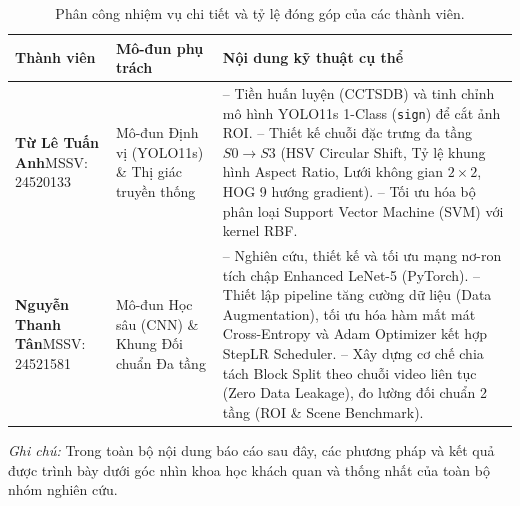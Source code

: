 \begin{table}[H]
\centering
\small
\caption{Phân công nhiệm vụ chi tiết và tỷ lệ đóng góp của các thành viên.}
\label{tab:phan_cong}
\begin{tabularx}{\textwidth}{|p{3.2cm}|p{3.5cm}|Y|}
\hline
\textbf{Thành viên} & \textbf{Mô-đun phụ trách} & \textbf{Nội dung kỹ thuật cụ thể} \\
\hline
\textbf{Từ Lê Tuấn Anh}\newline MSSV: 24520133 & Mô-đun Định vị (YOLO11s) \& Thị giác truyền thống & 
-- Tiền huấn luyện (CCTSDB) và tinh chỉnh mô hình YOLO11s 1-Class (\texttt{sign}) để cắt ảnh ROI.\newline
-- Thiết kế chuỗi đặc trưng đa tầng $S0 \rightarrow S3$ (HSV Circular Shift, Tỷ lệ khung hình Aspect Ratio, Lưới không gian $2 \times 2$, HOG 9 hướng gradient).\newline
-- Tối ưu hóa bộ phân loại Support Vector Machine (SVM) với kernel RBF. \\
\hline
\textbf{Nguyễn Thanh Tân}\newline MSSV: 24521581 & Mô-đun Học sâu (CNN) \& Khung Đối chuẩn Đa tầng & 
-- Nghiên cứu, thiết kế và tối ưu mạng nơ-ron tích chập Enhanced LeNet-5 (PyTorch).\newline
-- Thiết lập pipeline tăng cường dữ liệu (Data Augmentation), tối ưu hóa hàm mất mát Cross-Entropy và Adam Optimizer kết hợp StepLR Scheduler.\newline
-- Xây dựng cơ chế chia tách Block Split theo chuỗi video liên tục (Zero Data Leakage), đo lường đối chuẩn 2 tầng (ROI \& Scene Benchmark). \\
\hline
\end{tabularx}
\end{table}

\textit{Ghi chú:} Trong toàn bộ nội dung báo cáo sau đây, các phương pháp và kết quả được trình bày dưới góc nhìn khoa học khách quan và thống nhất của toàn bộ nhóm nghiên cứu.


\cleardoublepage
{}
\setcounter{page}{1}
